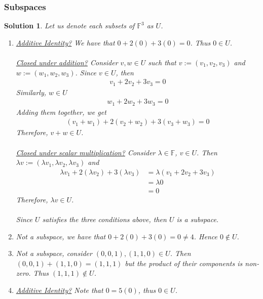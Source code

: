 \documentclass[12pt]{article}
\newcommand{\F}{\mathbb{F}}
\theoremstyle{problem}
\newtheorem{sol}{Solution}
\theoremstyle{remark}
\begin{document}
\subsubsection{Subspaces}
\begin{sol}
Let us denote each subsets of $\F^3$ as $U$. \\
\begin{enumerate}
    \item 
    \textit{\underline{Additive Identity?}} We have that $0+2(0) + 3(0) = 0$. Thus $0 \in U$. \\ \\
    \textit{\underline{Closed under addition?}} Consider $v,w \in U$ such that $v:=(v_1,v_2,v_3)$ and $w := (w_1, w_2,w_3)$. Since $v \in U$, then 
    \begin{align*}
        v_1 + 2v_2 + 3v_3 = 0
    \end{align*}
    Similarly, $w \in U$
    \begin{align*}
        w_1 + 2w_2 + 3w_3 = 0
    \end{align*}
    Adding them together, we get
    \begin{align*}
        (v_1 + w_1) + 2(v_2 + w_2) + 3(v_3 + w_3) = 0
    \end{align*}
    Therefore, $v + w \in U$. \\ \\
    \textit{\underline{Closed under scalar multiplication?}} Consider $\lambda \in \F$, $v \in U$. Then $\lambda v := (\lambda v_1, \lambda v_2, \lambda v_3)$ and 
    \begin{align*}
        \lambda v_1 + 2(\lambda v_2) + 3(\lambda v_3) &= \lambda(v_1 + 2v_2 + 3v_3)  \\ &= \lambda 0 \\ &= 0
    \end{align*}
    Therefore, $\lambda v \in U$. \\ \\
    Since $U$ satisfies the three conditions above, then $U$ is a subspace.
    \item 
    Not a subspace, we have that $0 + 2(0) + 3(0) = 0 \neq 4$. Hence $0 \not\in U$.
    \item
    Not a subspace, consider $(0,0,1), (1,1,0) \in U$. Then $(0,0,1) + (1,1,0) = (1,1,1)$ but the product of their components is non-zero. Thus $(1,1,1) \not\in U$.
    \item
    \textit{\underline{Additive Identity?}} Note that $0 = 5(0)$, thus $0 \in U$.  \\ \\

\end{enumerate}
\end{sol}
\end{document}
